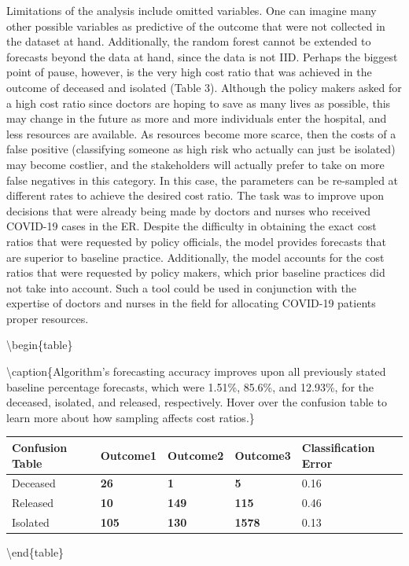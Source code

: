\documentclass[
]{article}
\begin{document}
Limitations of the analysis include omitted variables. One can imagine
many other possible variables as predictive of the outcome that were not
collected in the dataset at hand. Additionally, the random forest cannot
be extended to forecasts beyond the data at hand, since the data is not
IID. Perhaps the biggest point of pause, however, is the very high cost
ratio that was achieved in the outcome of deceased and isolated (Table
3). Although the policy makers asked for a high cost ratio since doctors
are hoping to save as many lives as possible, this may change in the
future as more and more individuals enter the hospital, and less
resources are available. As resources become more scarce, then the costs
of a false positive (classifying someone as high risk who actually can
just be isolated) may become costlier, and the stakeholders will
actually prefer to take on more false negatives in this category. In
this case, the parameters can be re-sampled at different rates to
achieve the desired cost ratio. The task was to improve upon decisions
that were already being made by doctors and nurses who received COVID-19
cases in the ER. Despite the difficulty in obtaining the exact cost
ratios that were requested by policy officials, the model provides
forecasts that are superior to baseline practice. Additionally, the
model accounts for the cost ratios that were requested by policy makers,
which prior baseline practices did not take into account. Such a tool
could be used in conjunction with the expertise of doctors and nurses in
the field for allocating COVID-19 patients proper resources.

\begin{col-sm-6}

\textbackslash begin\{table\}

\textbackslash caption\{\label{tab:unnamed-chunk-2}Algorithm's
forecasting accuracy improves upon all previously stated baseline
percentage forecasts, which were 1.51\%, 85.6\%, and 12.93\%, for the
deceased, isolated, and released, respectively. Hover over the confusion
table to learn more about how sampling affects cost ratios.\} \centering

\begin{tabular}[t]{l|l|l|l|l}
\hline
Confusion Table & Outcome1 & Outcome2 & Outcome3 & Classification Error\\
\hline
Deceased & \textbf{26} & \textbf{1} & \textbf{5} & 0.16\\
\hline
Released & \textbf{10} & \textbf{149} & \textbf{115} & 0.46\\
\hline
Isolated & \textbf{105} & \textbf{130} & \textbf{1578} & 0.13\\
\hline
\end{tabular}

\textbackslash end\{table\}

\end{col-sm-6}
\end{document}
